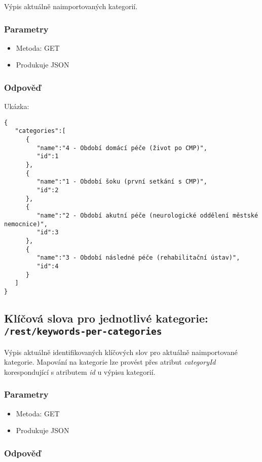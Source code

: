 \documentclass{article}
\begin{document}
Výpis aktuálně naimportovaných kategorií.

\subsubsection{Parametry}

\begin{itemize}
	\item Metoda: GET
	\item Produkuje JSON
\end{itemize}

\subsubsection{Odpověď}

Ukázka:

\begin{verbatim}
{
   "categories":[
      {
         "name":"4 - Období domácí péče (život po CMP)",
         "id":1
      },
      {
         "name":"1 - Období šoku (první setkání s CMP)",
         "id":2
      },
      {
         "name":"2 - Období akutní péče (neurologické oddělení městské nemocnice)",
         "id":3
      },
      {
         "name":"3 - Období následné péče (rehabilitační ústav)",
         "id":4
      }
   ]
}
\end{verbatim}

\subsection{Klíčová slova pro jednotlivé kategorie: \texttt{/rest/keywords-per-categories}}

Výpis aktuálně identifikovaných klíčových slov pro aktuálně naimportované kategorie. Mapování na kategorie lze provést přes atribut \textit{categoryId} korespondující s atributem \textit{id} u výpisu kategorií.

\subsubsection{Parametry}

\begin{itemize}
	\item Metoda: GET
	\item Produkuje JSON
\end{itemize}

\subsubsection{Odpověď}
\end{document}
